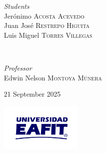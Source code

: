 \begin{titlepage}
	\begin{minipage}{0.4\textwidth}
		\begin{flushleft}
			\large
			\textit{Students}\\
			Jerónimo \textsc{Acosta Acevedo}\\
			Juan José \textsc{Restrepo Higuita}\\
			Luis Miguel \textsc{Torres Villegas}\\
		\end{flushleft}
	\end{minipage}
	~
	\begin{minipage}{0.4\textwidth}
		\begin{flushright}
			\large
			\textit{Professor}\\
			Edwin Nelson \textsc{Montoya Múnera}
		\end{flushright}
	\end{minipage}



	\vfill\vfill\vfill %

	{\large 21 September 2025} %


	\vfill\vfill
	\includegraphics[width=0.3\textwidth]{images/logo-eafit-latex.pdf}\\[1cm] %


	\vfill %

\end{titlepage}
